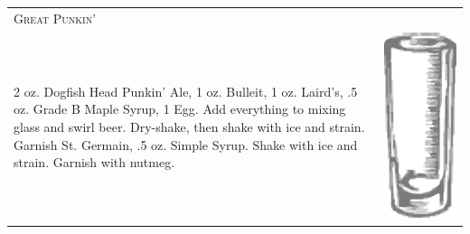 \documentclass{article}
\begin{document}
\begin{tabular}{p{2in} p{0.5in}}
\multicolumn{2}{p{3in}}{\centering\Huge\textsc{Great Punkin'}} \\ 
  \vspace{-0.1in}2 oz. Dogfish Head Punkin' Ale, 1 oz. Bulleit, 1 oz. Laird's, .5 oz. Grade B Maple Syrup, 1 Egg. Add everything to mixing glass and swirl beer. Dry-shake, then shake with ice and  strain. Garnish St. Germain, .5 oz. Simple Syrup.  Shake with ice and strain. Garnish with nutmeg. &
  \vspace{-0.1in} \includegraphics{collins.png}
\end{tabular}
\end{document}
